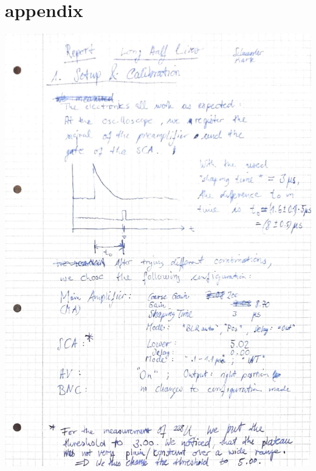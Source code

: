 \section{appendix}
\label{sec:appendix}
    \includegraphics[width=\linewidth]{records/page1.jpeg}
\clearpage
